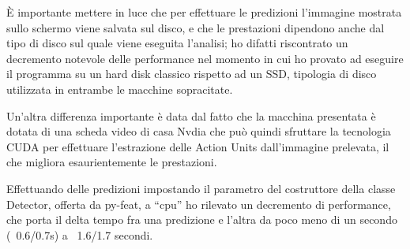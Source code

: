 È importante mettere in luce che per effettuare le predizioni l’immagine mostrata sullo schermo viene salvata sul disco, e che le prestazioni dipendono anche dal tipo di disco sul quale viene eseguita l’analisi; ho difatti riscontrato un decremento notevole delle performance nel momento in cui ho provato ad eseguire il programma su un hard disk classico rispetto ad un SSD, tipologia di disco utilizzata in entrambe le macchine sopracitate.

Un’altra differenza importante è data dal fatto che la macchina presentata è dotata di una scheda video di casa Nvdia che può quindi sfruttare la tecnologia CUDA per effettuare l’estrazione delle Action Units dall’immagine prelevata, il che migliora esaurientemente le prestazioni.

Effettuando delle predizioni impostando il parametro del costruttore della classe Detector, offerta da py-feat, a “cpu” ho rilevato un decremento di performance, che porta il delta tempo fra una predizione e l’altra da poco meno di un secondo (~0.6/0.7s) a ~1.6/1.7 secondi.
